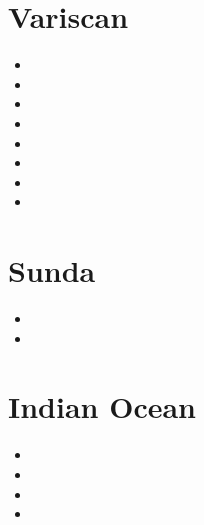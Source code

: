 \section{Variscan}

\begin{small}
\begin{itemize}
\item[\nineteenninetynine] 
\item[\twothousandfour] 
\item[\twothousandseven] 
\item[\twothousandthirteen] 
\item[\twothousandseventeen] 
\item[\twothousandeighteen] 
\item[\twothousandtwenty] 
\item[\twothousandtwentyone] 
\end{itemize}
\end{small}

\section{Sunda}

\begin{small}
\begin{itemize}
\item[\twothousandeighteen]
\item[\twothousandtwentytwo]
\end{itemize}
\end{small}

\section{Indian Ocean} 

\begin{small}
\begin{itemize}
\item[\nineteenseventythree]
\item[\twothousandtwelve]
\item[\twothousandseventeen]
\item[\twothousandtwentytwo] 
\end{itemize}
\end{small}

